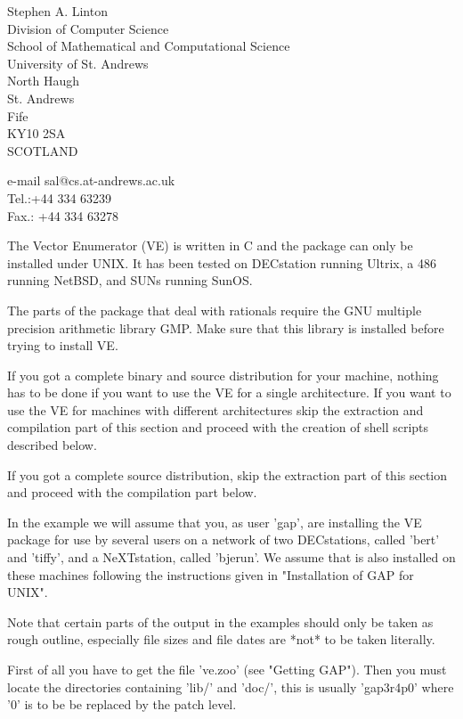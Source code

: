 Stephen A. Linton \\
Division of Computer Science \\
School of Mathematical and Computational Science \\
University of St. Andrews \\
North Haugh \\
St. Andrews \\
Fife \\
KY10 2SA \\
SCOTLAND

e-mail sal@cs.at-andrews.ac.uk \\
Tel.:+44 334 63239 \\
Fax.: +44 334 63278


The Vector Enumerator (VE) is written in C and the package can only be
installed under UNIX.  It has been tested on DECstation running
Ultrix, a 486 running NetBSD, and SUNs running SunOS.

The parts of the package that deal with rationals require the GNU multiple
precision arithmetic library GMP.  Make sure that this library is installed
before trying to install VE.

If you got  a complete binary and  source distribution for your  machine,
nothing  has   to be done  if   you want to  use    the VE for   a single
architecture.  If  you  want to use  the VE  for  machines with different
architectures skip  the extraction and  compilation part of  this section
and proceed with the creation of shell scripts described below.

If you  got a complete source distribution,  skip the  extraction part of
this section and proceed with the compilation part below.

In the example we will assume that you, as user 'gap', are installing the
VE  package for  use by  several users on  a network of two  DECstations,
called 'bert' and 'tiffy', and a NeXTstation, called 'bjerun'. We  assume
that  {\GAP}  is  also   installed  on  these   machines  following   the
instructions given in "Installation of GAP for UNIX".

Note that certain parts  of  the  output  in the examples should  only be
taken as rough outline, especially file sizes and file dates are *not* to
be taken literally.

First of all you have to get the file 've.zoo' (see "Getting GAP").  Then
you must locate the {\GAP} directories containing 'lib/' and 'doc/', this
is usually 'gap3r4p0' where '0' is to be be replaced by the patch level.


